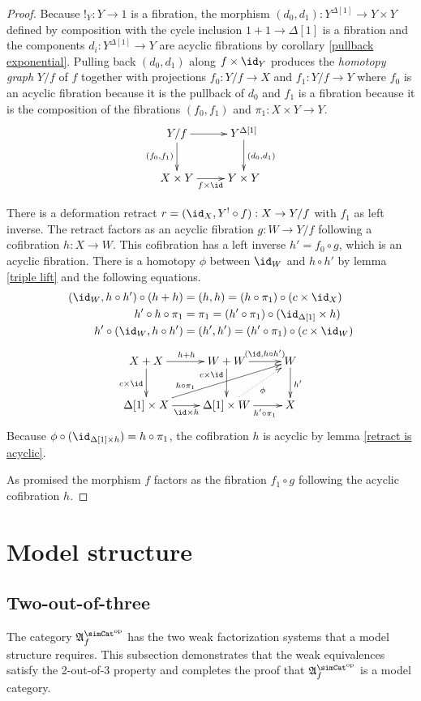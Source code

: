 \documentclass{tac}
\newcommand\dual{^{\mathrm{op}}}
\newcommand\s{^{\simCat\dual}}
\newcommand\bang{!}
\newcommand\of{:}
\newcommand\simplex\Delta
\newcommand\f{_f}
\newcommand\ambient{\mathfrak A}
\begin{document}
\begin{proof} Because $\bang_Y\of Y\to 1$ is a fibration, the morphism $(d_0,d_1)\of Y^{\simplex[1]} \to Y\times Y$ defined by composition with the cycle inclusion $1+1\to \simplex[1]$ is a fibration and the components $d_i\of Y^{\simplex[1]}\to Y$ are acyclic fibrations by corollary \ref{pullback exponential}. Pulling back $(d_0,d_1)$ along $f\times \id_Y$ produces the \emph{homotopy graph} $Y/f$ of $f$ together with projections $f_0\of Y/f\to X$ and $f_1\of Y/f\to Y$ where $f_0$ is an acyclic fibration because it is the pullback of $d_0$ and $f_1$ is a fibration because it is the composition of the fibrations $(f_0,f_1)$ and $\pi_1\of X\times Y\to Y$.
\[\xymatrix{
Y/f \ar[r]\ar[d]_{(f_0,f_1)} & Y^{\simplex[1]} \ar[d]^{(d_0,d_1)} \\
X\times Y \ar[r]_{f\times\id} & Y\times Y
}\]

There is a deformation retract $r=(\id_X,Y^\bang\circ f)\of X\to Y/f$ with $f_1$ as left inverse. The retract factors as an acyclic fibration $g\of W\to Y/f$ following a cofibration $h\of X\to W$. This cofibration has a left inverse $h' = f_0\circ g$, which is an acyclic fibration. There is a homotopy $\phi$ between $\id_{W}$ and $h\circ h'$ by lemma \ref{triple lift} and the following equations.
\begin{align*}
(\id_W,h\circ h')\circ(h+h)&=(h,h)= (h\circ\pi_1)\circ (c\times \id_X)\\
h'\circ h\circ \pi_1&=\pi_1=(h'\circ\pi_1)\circ(\id_{\simplex[1]}\times h)\\
h'\circ(\id_W,h\circ h')&=(h',h')= (h'\circ\pi_1)\circ (c\times \id_W)
\end{align*}
\[\xymatrix{
X+X\ar[d]_{c\times \id}\ar[r]^{h+h} & W+W\ar[d]_(.3){c\times \id}\ar[r]^(.6){(\id,h\circ h')} & W\ar[d]^{h'}\\
\simplex[1]\times X\ar[r]_{\id\times h} \ar[urr]^(.3){h\circ\pi_1}  & \simplex[1]\times W\ar[r]_(.6){h'\circ\pi_1} \ar@{.>}[ur]_\phi & X
}\]
Because $\phi\circ(\id_{\simplex[1]\times h}) = h\circ \pi_1$, the cofibration $h$ is acyclic by lemma \ref{retract is acyclic}. 

As promised the morphism $f$ factors as the fibration $f_1\circ g$ following the acyclic cofibration $h$.
\end{proof}


\section{Model structure}
\subsection{Two-out-of-three}
The category $\ambient\s\f$ has the two weak factorization systems that a model structure requires. This subsection demonstrates that the weak equivalences satisfy the 2-out-of-3 property and completes the proof that $\ambient\s\f$ is a model category.
\end{document}
